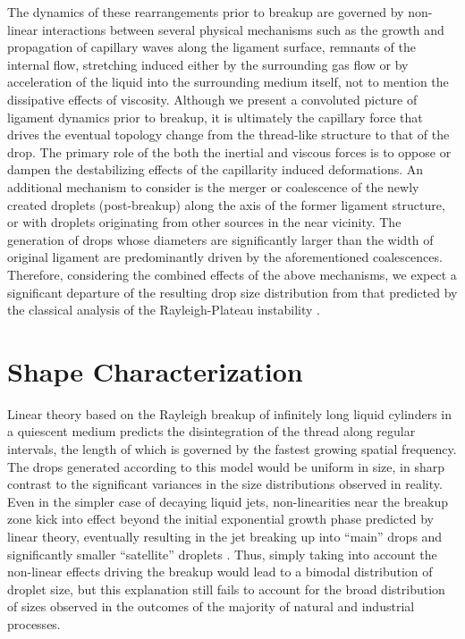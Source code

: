 The dynamics of these rearrangements prior to breakup are 
governed by non-linear interactions between several 
physical mechanisms such as the growth and propagation of capillary 
waves along the ligament surface, remnants of the internal flow, 
stretching induced either by the surrounding gas flow or by 
acceleration of the liquid into the surrounding medium itself,
not to mention the dissipative effects of viscosity.  
Although we present a convoluted picture of ligament dynamics prior
to breakup, it is ultimately the capillary force that drives the 
eventual topology change from the thread-like structure to that of the drop. 
The primary role of the both the inertial and viscous forces is to oppose 
or dampen the destabilizing effects of the capillarity induced deformations.   
An additional mechanism to consider is the merger or coalescence of the 
newly created droplets (post-breakup) along the axis of the former ligament
structure, or with droplets originating from other sources in the near vicinity. 
The generation of drops whose diameters are significantly larger than the 
width of original ligament are predominantly driven by the aforementioned coalescences.  
Therefore, considering the combined effects of the above mechanisms, we expect a significant
departure of the resulting drop size distribution from that predicted by the  
classical analysis of the Rayleigh-Plateau instability \cite{rayleigh1879a,rayleigh1879b}. 


\section{Shape Characterization}

Linear theory based on the Rayleigh breakup of infinitely
long liquid cylinders in a quiescent medium predicts the disintegration
of the thread along regular intervals, the length of which is governed
by the fastest growing spatial frequency. 
The drops generated according to this model would be uniform in
size, in sharp contrast to the significant variances in the size distributions
observed in reality.  
Even in the simpler case of decaying liquid jets, 
non-linearities near the breakup zone kick into effect beyond
the initial exponential growth phase predicted by linear theory, 
eventually resulting in the jet breaking up into 
``main'' drops and significantly smaller ``satellite'' droplets 
. 
Thus, simply taking into account the non-linear effects driving the breakup would
lead to a bimodal distribution of droplet size, but this explanation 
still fails to account for the broad distribution of sizes observed in 
the outcomes of the majority of natural \cite{nature} and industrial \cite{industrial} processes. 


